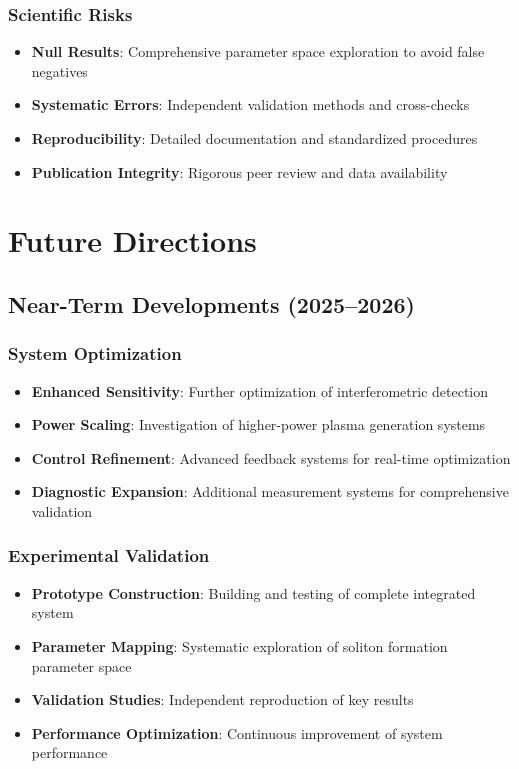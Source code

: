 \documentclass[12pt,a4paper]{article}
\begin{document}
\subsubsection{Scientific Risks}
\begin{itemize}
\item \textbf{Null Results}: Comprehensive parameter space exploration to avoid false negatives
\item \textbf{Systematic Errors}: Independent validation methods and cross-checks
\item \textbf{Reproducibility}: Detailed documentation and standardized procedures
\item \textbf{Publication Integrity}: Rigorous peer review and data availability
\end{itemize}

\section{Future Directions}

\subsection{Near-Term Developments (2025--2026)}

\subsubsection{System Optimization}
\begin{itemize}
\item \textbf{Enhanced Sensitivity}: Further optimization of interferometric detection
\item \textbf{Power Scaling}: Investigation of higher-power plasma generation systems
\item \textbf{Control Refinement}: Advanced feedback systems for real-time optimization
\item \textbf{Diagnostic Expansion}: Additional measurement systems for comprehensive validation
\end{itemize}

\subsubsection{Experimental Validation}
\begin{itemize}
\item \textbf{Prototype Construction}: Building and testing of complete integrated system
\item \textbf{Parameter Mapping}: Systematic exploration of soliton formation parameter space
\item \textbf{Validation Studies}: Independent reproduction of key results
\item \textbf{Performance Optimization}: Continuous improvement of system performance
\end{itemize}
\end{document}

